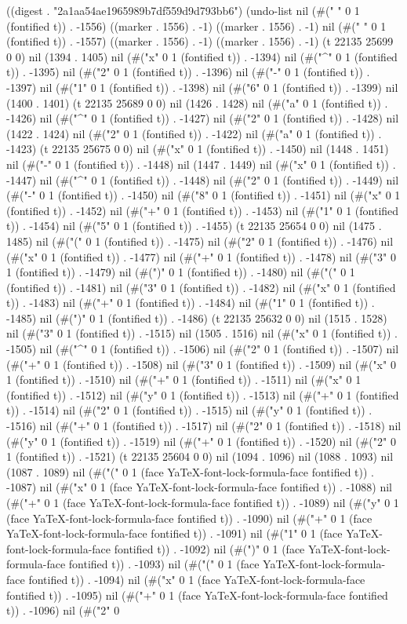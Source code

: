 
((digest . "2a1aa54ae1965989b7df559d9d793bb6") (undo-list nil (#("
" 0 1 (fontified t)) . -1556) ((marker . 1556) . -1) ((marker . 1556) . -1) nil (#(" " 0 1 (fontified t)) . -1557) ((marker . 1556) . -1) ((marker . 1556) . -1) (t 22135 25699 0 0) nil (1394 . 1405) nil (#("x" 0 1 (fontified t)) . -1394) nil (#("^" 0 1 (fontified t)) . -1395) nil (#("2" 0 1 (fontified t)) . -1396) nil (#("-" 0 1 (fontified t)) . -1397) nil (#("1" 0 1 (fontified t)) . -1398) nil (#("6" 0 1 (fontified t)) . -1399) nil (1400 . 1401) (t 22135 25689 0 0) nil (1426 . 1428) nil (#("a" 0 1 (fontified t)) . -1426) nil (#("^" 0 1 (fontified t)) . -1427) nil (#("2" 0 1 (fontified t)) . -1428) nil (1422 . 1424) nil (#("2" 0 1 (fontified t)) . -1422) nil (#("a" 0 1 (fontified t)) . -1423) (t 22135 25675 0 0) nil (#("x" 0 1 (fontified t)) . -1450) nil (1448 . 1451) nil (#("-" 0 1 (fontified t)) . -1448) nil (1447 . 1449) nil (#("x" 0 1 (fontified t)) . -1447) nil (#("^" 0 1 (fontified t)) . -1448) nil (#("2" 0 1 (fontified t)) . -1449) nil (#("-" 0 1 (fontified t)) . -1450) nil (#("8" 0 1 (fontified t)) . -1451) nil (#("x" 0 1 (fontified t)) . -1452) nil (#("+" 0 1 (fontified t)) . -1453) nil (#("1" 0 1 (fontified t)) . -1454) nil (#("5" 0 1 (fontified t)) . -1455) (t 22135 25654 0 0) nil (1475 . 1485) nil (#("(" 0 1 (fontified t)) . -1475) nil (#("2" 0 1 (fontified t)) . -1476) nil (#("x" 0 1 (fontified t)) . -1477) nil (#("+" 0 1 (fontified t)) . -1478) nil (#("3" 0 1 (fontified t)) . -1479) nil (#(")" 0 1 (fontified t)) . -1480) nil (#("(" 0 1 (fontified t)) . -1481) nil (#("3" 0 1 (fontified t)) . -1482) nil (#("x" 0 1 (fontified t)) . -1483) nil (#("+" 0 1 (fontified t)) . -1484) nil (#("1" 0 1 (fontified t)) . -1485) nil (#(")" 0 1 (fontified t)) . -1486) (t 22135 25632 0 0) nil (1515 . 1528) nil (#("3" 0 1 (fontified t)) . -1515) nil (1505 . 1516) nil (#("x" 0 1 (fontified t)) . -1505) nil (#("^" 0 1 (fontified t)) . -1506) nil (#("2" 0 1 (fontified t)) . -1507) nil (#("+" 0 1 (fontified t)) . -1508) nil (#("3" 0 1 (fontified t)) . -1509) nil (#("x" 0 1 (fontified t)) . -1510) nil (#("+" 0 1 (fontified t)) . -1511) nil (#("x" 0 1 (fontified t)) . -1512) nil (#("y" 0 1 (fontified t)) . -1513) nil (#("+" 0 1 (fontified t)) . -1514) nil (#("2" 0 1 (fontified t)) . -1515) nil (#("y" 0 1 (fontified t)) . -1516) nil (#("+" 0 1 (fontified t)) . -1517) nil (#("2" 0 1 (fontified t)) . -1518) nil (#("y" 0 1 (fontified t)) . -1519) nil (#("+" 0 1 (fontified t)) . -1520) nil (#("2" 0 1 (fontified t)) . -1521) (t 22135 25604 0 0) nil (1094 . 1096) nil (1088 . 1093) nil (1087 . 1089) nil (#("(" 0 1 (face YaTeX-font-lock-formula-face fontified t)) . -1087) nil (#("x" 0 1 (face YaTeX-font-lock-formula-face fontified t)) . -1088) nil (#("+" 0 1 (face YaTeX-font-lock-formula-face fontified t)) . -1089) nil (#("y" 0 1 (face YaTeX-font-lock-formula-face fontified t)) . -1090) nil (#("+" 0 1 (face YaTeX-font-lock-formula-face fontified t)) . -1091) nil (#("1" 0 1 (face YaTeX-font-lock-formula-face fontified t)) . -1092) nil (#(")" 0 1 (face YaTeX-font-lock-formula-face fontified t)) . -1093) nil (#("(" 0 1 (face YaTeX-font-lock-formula-face fontified t)) . -1094) nil (#("x" 0 1 (face YaTeX-font-lock-formula-face fontified t)) . -1095) nil (#("+" 0 1 (face YaTeX-font-lock-formula-face fontified t)) . -1096) nil (#("2" 0 